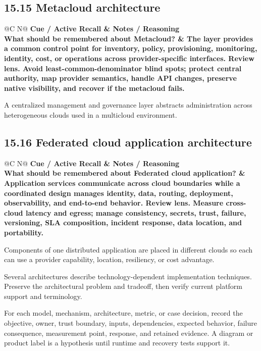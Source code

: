 \documentclass[11pt]{article}
\newcommand{\CornellHeader}{\rowcolor{Navy}\color{white}\bfseries Cue / Active Recall & \color{white}\bfseries Notes / Reasoning \\\endhead}
\newcommand{\CornellRow}[2]{\cellcolor{CueGray}\textbf{#1} & #2 \\\addlinespace[3pt]}
\begin{document}
\subsection{15.15 Metacloud architecture}
\begin{longtable}{@{}C N@{}}
\CornellHeader
\CornellRow{What should be remembered about Metacloud?}{The layer provides a common control point for inventory, policy, provisioning, monitoring, identity, cost, or operations across provider-specific interfaces. \textbf{Review lens.} Avoid least-common-denominator blind spots; protect central authority, map provider semantics, handle API changes, preserve native visibility, and recover if the metacloud fails.}
\end{longtable}
\begin{sectionsummarybox}
A centralized management and governance layer abstracts administration across heterogeneous clouds used in a multicloud environment.
\end{sectionsummarybox}
\subsection{15.16 Federated cloud application architecture}
\begin{longtable}{@{}C N@{}}
\CornellHeader
\CornellRow{What should be remembered about Federated cloud application?}{Application services communicate across cloud boundaries while a coordinated design manages identity, data, routing, deployment, observability, and end-to-end behavior. \textbf{Review lens.} Measure cross-cloud latency and egress; manage consistency, secrets, trust, failure, versioning, SLA composition, incident response, data location, and portability.}
\end{longtable}
\begin{sectionsummarybox}
Components of one distributed application are placed in different clouds so each can use a provider capability, location, resiliency, or cost advantage.
\end{sectionsummarybox}
\begin{scopenotebox}
Several architectures describe technology-dependent implementation techniques. Preserve the architectural problem and tradeoff, then verify current platform support and terminology.
\end{scopenotebox}
\begin{practicebox}
For each model, mechanism, architecture, metric, or case decision, record the objective, owner, trust boundary, inputs, dependencies, expected behavior, failure consequence, measurement point, response, and retained evidence. A diagram or product label is a hypothesis until runtime and recovery tests support it.
\end{practicebox}
\end{document}
